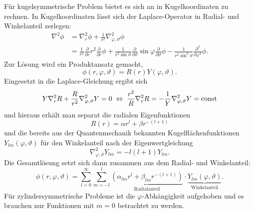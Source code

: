 Für kugelsymmetrische Problem bietet es sich an in Kugelkoordinaten zu rechnen. In Kugelkoordinaten lässt sich der Laplace-Operator in Radial- und Winkelanteil zerlegen:
\begin{align*}
	\nabla ^{2}\phi & =\nabla _{r}^{2}\phi +\frac{1}{r^{2}}\nabla _{\varphi ,\vartheta }^{2}\phi \\&=\frac{1}{r^{2}}\frac{\partial }{\partial r}r^{2}\frac{\partial }{\partial r}\phi +\frac{1}{r^{2}\sin \vartheta }\frac{\partial }{\partial \vartheta }\sin \varphi \frac{\partial }{\partial \vartheta }\phi -\frac{1}{r^{2}\sin ^{2} \vartheta }\frac{\partial ^{2}}{\partial \varphi ^{2}}\phi.
\end{align*}
Zur Lösung wird ein Produktansatz gemacht,
\begin{equation*}
	\phi \left(r,\varphi ,\vartheta \right)=R\left(r\right)Y\left(\varphi ,\vartheta \right).
\end{equation*}
Eingesetzt in die Laplace-Gleichung ergibt sich
\begin{equation*}
	Y\nabla _{r}^{2}R+\frac{R}{r^{2}}\nabla _{\varphi ,\vartheta }^{2}Y=0 \;\Leftrightarrow\;\frac{r^{2}}{R}\nabla _{r}^{2}R=-\frac{1}{Y}\nabla _{\varphi ,\vartheta }^{2}Y=\text{const}
\end{equation*}
und hieraus erhält man separat die radialen Eigenfunktionen
\begin{equation*}
	R\left(r\right)=\alpha r^{l}+\beta r^{-\left(l+1\right)}
\end{equation*}
und die bereits aus der Quantenmechanik bekannten Kugelflächenfunktionen $Y_{lm}\left(\varphi ,\vartheta \right)$ für den Winkelanteil nach der Eigenwertgleichung
\begin{equation*}
	\nabla _{\varphi ,\vartheta }^{2}Y_{lm}=-l\left(l+1\right)Y_{lm}.
\end{equation*}
Die Gesamtlösung setzt sich dann zusammen aus dem Radial- und Winkelanteil:
\begin{equation*}
	\phi \left(r,\varphi ,\vartheta \right)=\sum _{l=0}^{\infty }\sum _{m=-l}^{l}\underset{\text{Radialanteil}}{\underbrace{\left(\alpha _{lm}r^{l}+\beta _{lm}r^{-\left(l+1\right)}\right)}}\cdot\underset{\text{Winkelanteil}}{\underbrace{Y_{lm}\left(\varphi ,\vartheta \right)}}.
\end{equation*}
Für zylindersymmetrische Probleme ist die $\varphi $-Abhängigkeit aufgehoben und es brauchen nur Funktionen mit $m=0$ betrachtet zu werden.

